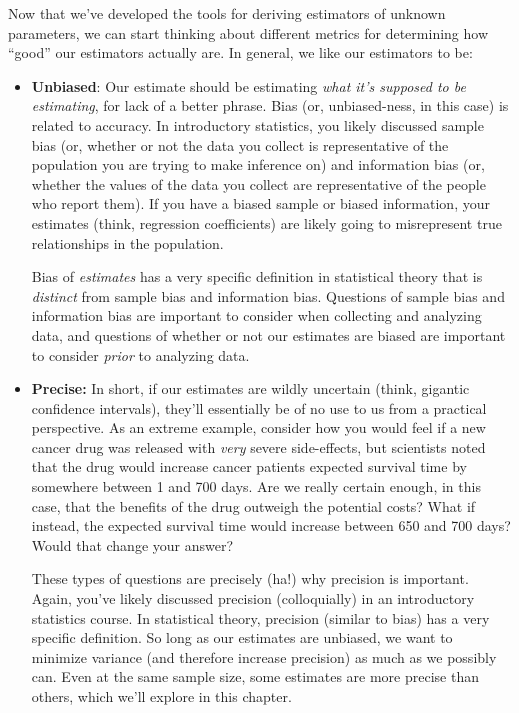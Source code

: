 \documentclass[
  letterpaper,
  DIV=11,
  numbers=noendperiod]{scrreprt}
\begin{document}
Now that we've developed the tools for deriving estimators of unknown
parameters, we can start thinking about different metrics for
determining how ``good'' our estimators actually are. In general, we
like our estimators to be:

\begin{itemize}
\item
  \textbf{Unbiased}: Our estimate should be estimating \emph{what it's
  supposed to be estimating}, for lack of a better phrase. Bias (or,
  unbiased-ness, in this case) is related to accuracy. In introductory
  statistics, you likely discussed sample bias (or, whether or not the
  data you collect is representative of the population you are trying to
  make inference on) and information bias (or, whether the values of the
  data you collect are representative of the people who report them). If
  you have a biased sample or biased information, your estimates (think,
  regression coefficients) are likely going to misrepresent true
  relationships in the population.

  Bias of \emph{estimates} has a very specific definition in statistical
  theory that is \emph{distinct} from sample bias and information bias.
  Questions of sample bias and information bias are important to
  consider when collecting and analyzing data, and questions of whether
  or not our estimates are biased are important to consider \emph{prior}
  to analyzing data.
\item
  \textbf{Precise:} In short, if our estimates are wildly uncertain
  (think, gigantic confidence intervals), they'll essentially be of no
  use to us from a practical perspective. As an extreme example,
  consider how you would feel if a new cancer drug was released with
  \emph{very} severe side-effects, but scientists noted that the drug
  would increase cancer patients expected survival time by somewhere
  between 1 and 700 days. Are we really certain enough, in this case,
  that the benefits of the drug outweigh the potential costs? What if
  instead, the expected survival time would increase between 650 and 700
  days? Would that change your answer?

  These types of questions are precisely (ha!) why precision is
  important. Again, you've likely discussed precision (colloquially) in
  an introductory statistics course. In statistical theory, precision
  (similar to bias) has a very specific definition. So long as our
  estimates are unbiased, we want to minimize variance (and therefore
  increase precision) as much as we possibly can. Even at the same
  sample size, some estimates are more precise than others, which we'll
  explore in this chapter.
\end{itemize}
\end{document}
